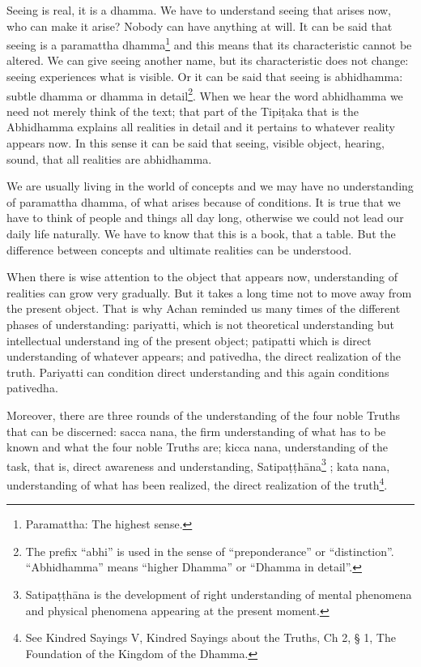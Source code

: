 Seeing is real, it is a dhamma. We have to understand seeing that arises now, who can 
make it arise? Nobody can have anything at will. It can be said that seeing is a paramattha dhamma\footnote{Paramattha: The highest sense.} and this means that its characteristic cannot be altered. We can give seeing another name, but its characteristic does not change: seeing experiences what 
is visible. Or it can be said that seeing is abhidhamma: subtle dhamma or dhamma in detail\footnote{The prefix ``abhi'' is used in the sense of ``preponderance'' or ``distinction''. ``Abhidhamma'' means ``higher Dhamma'' or ``Dhamma in detail''.}. When we hear the word abhidhamma we need not merely think of the text; 
that part of the Tipiṭaka that is the Abhidhamma explains all realities in detail and it 
pertains to whatever reality appears now. In this sense it can be said that seeing, visible object, hearing, sound, that all realities are abhidhamma. 

We are usually living in the world of concepts and we may have no understanding of 
paramattha dhamma, of what arises because of conditions. It is true that we have to 
think of people and things all day long, otherwise we could not lead our daily life naturally. We have to know that this is a book, that a table. But the difference between 
concepts and ultimate realities can be understood. 

When there is wise attention to the object that appears now, understanding of realities 
can grow very gradually. But it takes a long time not to move away from the present 
object. That is why  Achan reminded us many times of the different phases of understanding: pariyatti, which is not theoretical understanding but intellectual understand ing of the present object; patipatti which is direct understanding of whatever appears; 
and pativedha, the direct realization of the truth. Pariyatti can condition direct understanding and this again conditions pativedha. 

Moreover, there are three rounds of the understanding of the four noble Truths that 
can be discerned: sacca nana, the firm understanding of what has to be known and 
what the four noble Truths are; kicca nana, understanding of the task, that is, direct 
awareness and understanding, Satipaṭṭhāna\footnote{Satipaṭṭhāna is the development of right understanding of mental phenomena and physical phenomena appearing at the present moment. } ; kata nana, understanding of what has been realized, the direct realization of the truth\footnote{See Kindred Sayings V, Kindred Sayings about the Truths, Ch 2, § 1, The Foundation of the 
Kingdom of the Dhamma. }. 

